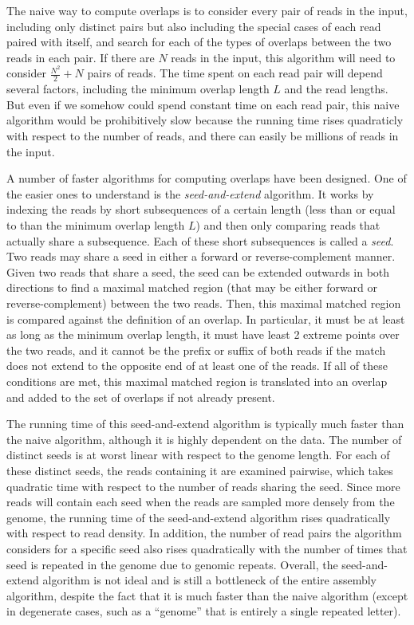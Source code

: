 \documentclass[10pt]{article}
\newcommand{\KeyTerm}[1]{{\it #1}}
\begin{document}
The naive way to compute overlaps is to consider every pair of reads in the
input, including only distinct pairs but also including the special cases of
each read paired with itself, and search for each of the types of overlaps
between the two reads in each pair.  If there are $N$ reads in the input, this
algorithm will need to consider $\frac{N^2}{2} + N$ pairs of reads. The time
spent on each read pair will depend several factors, including the minimum
overlap length $L$ and the read lengths.  But even if we somehow could spend
constant time on each read pair, this naive algorithm would be prohibitively
slow because the running time rises quadraticly with respect to the number of
reads, and there can easily be millions of reads in the input.

A number of faster algorithms for computing overlaps have been designed.  One of
the easier ones to understand is the \KeyTerm{seed-and-extend} algorithm.  It
works by indexing the reads by short subsequences of a certain length (less than
or equal to than the minimum overlap length $L$) and then only comparing reads
that actually share a subsequence.  Each of these short subsequences is called a
\KeyTerm{seed}.  Two reads may share a seed in either a forward or
reverse-complement manner.  Given two reads that share a seed, the seed can be
extended outwards in both directions to find a maximal matched region (that may
be either forward or reverse-complement) between the two reads.  Then, this
maximal matched region is compared against the definition of an overlap.  In
particular, it must be at least as long as the minimum overlap length, it must
have least 2 extreme points over the two reads, and it cannot be the prefix or
suffix of both reads if the match does not extend to the opposite end of at
least one of the reads.  If all of these conditions are met, this maximal matched
region is translated into an overlap and added to the set of overlaps if not
already present.

The running time of this seed-and-extend algorithm is
typically much faster than the naive algorithm, although it is highly dependent
on the data.  The number of distinct seeds is at worst linear with respect to
the genome length.
For each of these distinct seeds, the reads containing it are examined pairwise,
which takes quadratic time with respect to the number of reads sharing the
seed.  Since more reads will contain each seed when the reads are sampled more
densely from the genome, the running time of the seed-and-extend algorithm rises
quadratically with respect to read density.  In addition, the number of read
pairs the algorithm considers for a specific seed also rises quadratically with
the number of times that seed is repeated in the genome due to genomic repeats.
Overall, the seed-and-extend algorithm is not ideal and is still a bottleneck of
the entire assembly algorithm, despite the fact that it is much faster than the
naive algorithm (except in degenerate cases, such as a ``genome'' that is
entirely a single repeated letter).
\end{document}
